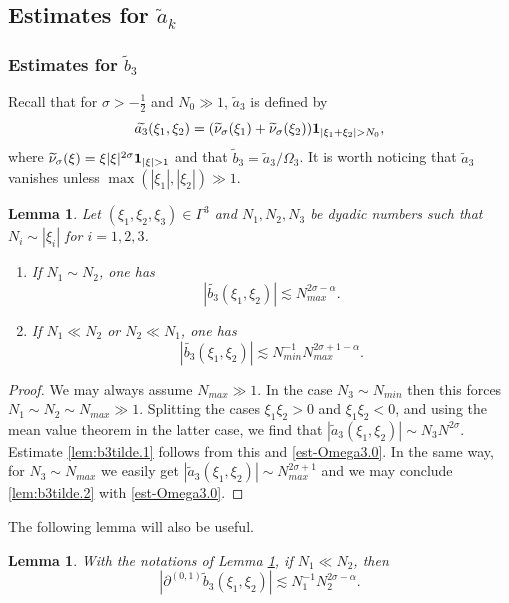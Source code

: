 \documentclass{amsart}
\newtheorem{lemma}[theorem]{Lemma}
\theoremstyle{definition}
\theoremstyle{remark}
\numberwithin{equation}{section}
\begin{document}
\subsection{Estimates for $\widetilde{a}_k$}
\subsubsection{Estimates for $\widetilde{b}_3$}
Recall that for  $\sigma>-\frac 12$ and $N_0\gg 1$, $\widetilde{a}_3$ is defined by
$$
\widetilde{a_3}(\xi_1, \xi_2) = (\widetilde{\nu}_\sigma(\xi_1) + \widetilde{\nu}_\sigma(\xi_2)){\bf 1}_{|\xi_1+\xi_2|>N_0},
$$
where $\widetilde{\nu}_\sigma(\xi)=\xi|\xi|^{2\sigma}{\bf 1}_{|\xi|>1}$ and that $\widetilde{b}_3 = \widetilde{a}_3 / \Omega_3$.  It is worth noticing that $\widetilde{a}_3$ vanishes unless $\max(|\xi_1|, |\xi_2|)\gg 1$.

\begin{lemma}\label{lem:b3tilde}
  Let $(\xi_1, \xi_2, \xi_3)\in \Gamma^3$ and $N_1,N_2,N_3$ be dyadic numbers such that $N_i\sim |\xi_i|$ for $i=1,2,3$. 
  \begin{enumerate}
    \item If $N_1\sim N_2$, one has
    \begin{equation}\label{lem:b3tilde.1}
    |\widetilde{b_3}(\xi_1, \xi_2)| \lesssim N_{max}^{2\sigma-\alpha}.
    \end{equation}
    \item If $N_1\ll N_2$ or $N_2\ll N_1$, one has
    \begin{equation}\label{lem:b3tilde.2}
    |\widetilde{b_3}(\xi_1, \xi_2)| \lesssim N_{min}^{-1} N_{max}^{2\sigma+1-\alpha}.
    \end{equation}
  \end{enumerate}
\end{lemma}
\begin{proof}
We may always assume $N_{max}\gg 1$. In the case $N_3\sim N_{min}$ then this forces $N_1\sim N_2\sim N_{max}\gg 1$. Splitting the cases $\xi_1\xi_2>0$ and $\xi_1\xi_2<0$, and using the mean value theorem in the latter case, we find that $|\widetilde{a}_3(\xi_1, \xi_2)|\sim N_3 N^{2\sigma}$. Estimate \eqref{lem:b3tilde.1} follows from this and \eqref{est-Omega3.0}. In the same way, for $N_3\sim N_{max}$ we easily get $|\widetilde{a}_3(\xi_1, \xi_2)|\sim N_{max}^{2\sigma+1}$ and we may conclude \eqref{lem:b3tilde.2} with \eqref{est-Omega3.0}.
\end{proof}

The following lemma will also be useful.
\begin{lemma}\label{lem:diff-b3tilde}
  With the notations of Lemma \ref{lem:b3tilde}, if $N_1\ll N_2$, then
  \begin{equation}\label{lem:diff-b3tilde.0}
    |\partial^{(0,1)}\widetilde{b}_3(\xi_1, \xi_2)| \lesssim N_1^{-1}N_2^{2\sigma-\alpha}.
  \end{equation}
\end{lemma}
\end{document}
